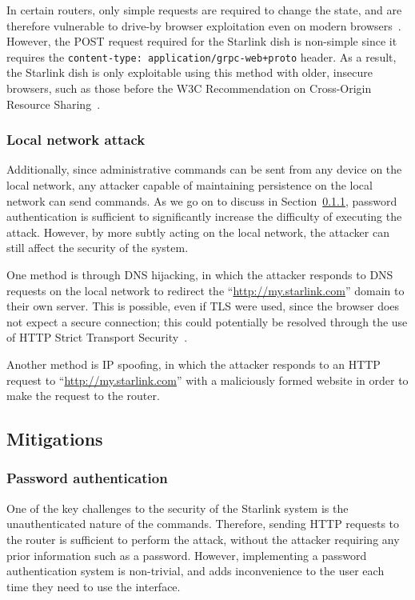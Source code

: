 In certain routers, only simple requests are required to change the state, and are therefore vulnerable to drive-by browser exploitation even on modern browsers~\cite{csrf_internal_network}.
However, the POST request required for the Starlink dish is non-simple since it requires the \texttt{content-type: application/grpc-web+proto} header.
As a result, the Starlink dish is only exploitable using this method with older, insecure browsers, such as those before the W3C Recommendation on Cross-Origin Resource Sharing~\cite{cors_w3c}.

\subsubsection{Local network attack}

Additionally, since administrative commands can be sent from any device on the local network, any attacker capable of maintaining persistence on the local network can send commands.
As we go on to discuss in Section~\ref{sec:password_authentication}, password authentication is sufficient to significantly increase the difficulty of executing the attack.
However, by more subtly acting on the local network, the attacker can still affect the security of the system.

One method is through DNS hijacking, in which the attacker responds to DNS requests on the local network to redirect the ``\url{http://my.starlink.com}'' domain to their own server.
This is possible, even if TLS were used, since the browser does not expect a secure connection; this could potentially be resolved through the use of HTTP Strict Transport Security~\cite{rfc6797}.

Another method is IP spoofing, in which the attacker responds to an HTTP request to ``\url{http://my.starlink.com}'' with a maliciously formed website in order to make the request to the router.

\subsection{Mitigations}

\subsubsection{Password authentication}\label{sec:password_authentication}

One of the key challenges to the security of the Starlink system is the unauthenticated nature of the commands.
Therefore, sending HTTP requests to the router is sufficient to perform the attack, without the attacker requiring any prior information such as a password.
However, implementing a password authentication system is non-trivial, and adds inconvenience to the user each time they need to use the interface.

